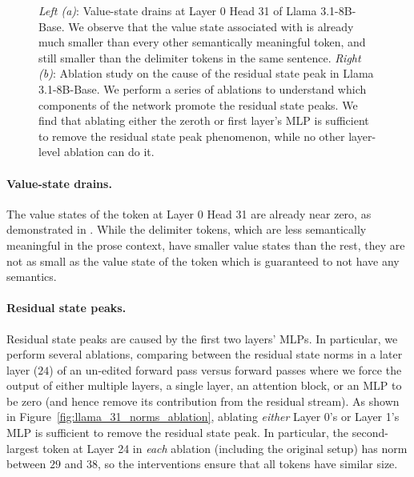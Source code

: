 \begin{figure}[h]
     \caption{\small \textit{Left (a)}: Value-state drains at Layer 0 Head 31 of Llama 3.1-8B-Base. We observe that the value state associated with \bos{} is already much smaller than every other semantically meaningful token, and still smaller than the delimiter tokens in the same sentence. \textit{Right (b)}: Ablation study on the cause of the residual state peak in Llama 3.1-8B-Base. We perform a series of ablations to understand which components of the network promote the residual state peaks. We find that ablating either the zeroth or first layer's MLP is sufficient to remove the residual state peak phenomenon, while no other layer-level ablation can do it.}
     \label{fig:llama_31_value_states and norms}
 \end{figure}

\paragraph{Value-state drains.} The value states of the \bos{} token at Layer \(0\) Head 31 are already near zero, as demonstrated in . While the delimiter tokens, which are less semantically meaningful in the prose context, have smaller value states than the rest, they are not as small as the value state of the \bos{} token which is guaranteed to not have any semantics.


\paragraph{Residual state peaks.} Residual state peaks are caused by the first two layers' MLPs. In particular, we perform several ablations, comparing between the residual state norms in a later layer (\(24\)) of an un-edited forward pass versus forward passes where we force the output of either multiple layers, a single layer, an attention block, or an MLP to be zero (and hence remove its contribution from the residual stream). As shown in Figure~\ref{fig:llama_31_norms_ablation}, ablating \textit{either} Layer 0's or Layer 1's MLP is sufficient to remove the residual state peak. In particular, the second-largest token at Layer 24 in \textit{each} ablation (including the original setup) has norm between \(29\) and \(38\), so the interventions ensure that all tokens have similar size.

